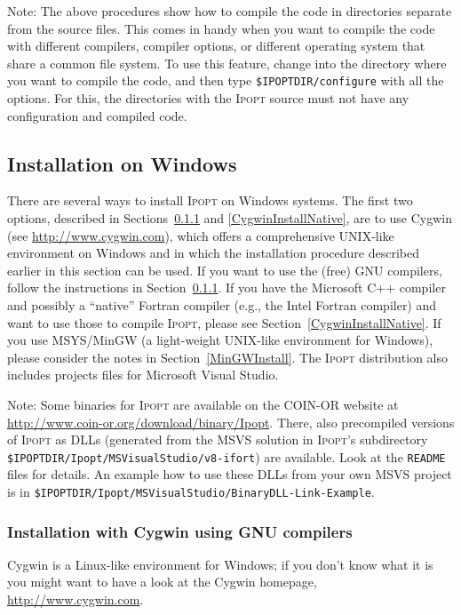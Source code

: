 \documentclass[10pt]{article}
\newcommand{\Ipopt}{\textsc{Ipopt}\xspace}
\begin{document}
Note: The above procedures show how to compile the code in directories
separate from the source files.  This comes in handy when you want to
compile the code with different compilers, compiler options, or
different operating system that share a common file system.  To use
this feature, change into the directory where you want to compile the
code, and then type {\tt \$IPOPTDIR/configure} with all the options.
For this, the directories with the \Ipopt source must not have any
configuration and compiled code.

\subsection{Installation on Windows}\label{WindowsInstall}

There are several ways to install \Ipopt on Windows systems.  The
first two options, described in Sections~\ref{CygwinInstall} and
\ref{CygwinInstallNative}, are to use Cygwin (see
\url{http://www.cygwin.com}), which offers a comprehensive UNIX-like
environment on Windows and in which the installation procedure
described earlier in this section can be used.  If you want to use the
(free) GNU compilers, follow the instructions in
Section~\ref{CygwinInstall}.  If you have the Microsoft C++ compiler
and possibly a ``native'' Fortran compiler (e.g., the Intel Fortran
compiler) and want to use those to compile \Ipopt, please see
Section~\ref{CygwinInstallNative}.  If you use MSYS/MinGW (a
light-weight UNIX-like environment for Windows), please consider the
notes in Section~\ref{MinGWInstall}.
%
The \Ipopt distribution also includes projects files for
Microsoft Visual Studio. %

Note: Some binaries for \Ipopt are available on the COIN-OR website at
\url{http://www.coin-or.org/download/binary/Ipopt}.
There, also precompiled versions of \Ipopt as DLLs (generated from
the MSVS solution in \Ipopt's subdirectory
\texttt{\$IPOPTDIR/Ipopt/MSVisualStudio/v8-ifort}) are available.  Look at the
\texttt{README} files for details.  An example how to use these DLLs
from your own MSVS project is in
\texttt{\$IPOPTDIR/Ipopt/MSVisualStudio/BinaryDLL-Link-Example}.


\subsubsection{Installation with Cygwin using GNU compilers}\label{CygwinInstall}

Cygwin is a Linux-like environment for Windows; if you don't know what
it is you might want to have a look at the Cygwin homepage,
\url{http://www.cygwin.com}.
\end{document}
